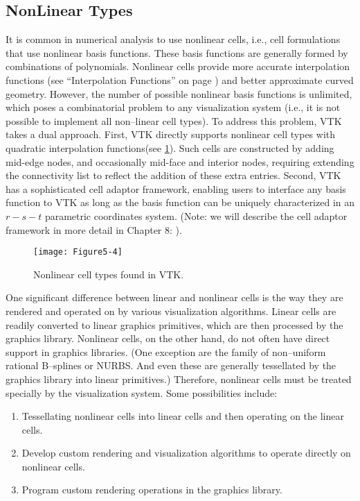 \subsection{NonLinear Types}

It is common in numerical analysis to use nonlinear cells, i.e., cell formulations that use nonlinear basis functions. These basis functions are generally formed by combinations of polynomials. Nonlinear cells provide more accurate interpolation functions (see ``Interpolation Functions'' on page \pageref{sec:interpolation_functions}) and better approximate curved geometry. However, the number of possible nonlinear basis functions is unlimited, which poses a combinatorial problem to any visualization system (i.e., it is not possible to implement all non--linear cell types). To address this problem, VTK takes a dual approach. First, VTK directly supports nonlinear cell types with quadratic interpolation functions(see \ref{fig:Figure5-4}). Such cells are constructed by adding mid-edge nodes, and occasionally mid-face and interior nodes, requiring extending the connectivity list to reflect the addition of these extra entries. Second, VTK has a sophisticated cell adaptor framework, enabling users to interface any basis function to VTK as long as the basis function can be uniquely characterized in an $r-s-t$ parametric coordinates system. (Note: we will describe the cell adaptor framework in more detail in Chapter 8: ).


\begin{figure}[!htb]
	\centering
	\texttt{[image: Figure5-4]}
	\caption{Nonlinear cell types found in VTK.}
	\label{fig:Figure5-4}
\end{figure}

One significant difference between linear and nonlinear cells is the way they are rendered and operated on by various visualization algorithms. Linear cells are readily converted to linear graphics primitives, which are then processed by the graphics library. Nonlinear cells, on the other hand, do not often have direct support in graphics libraries. (One exception are the family of non--uniform rational B--splines or NURBS. And even these are generally tessellated by the graphics library into linear primitives.) Therefore, nonlinear cells must be treated specially by the visualization system. Some possibilities include:

\begin{enumerate}

\item Tessellating nonlinear cells into linear cells and then operating on the linear cells.

\item Develop custom rendering and visualization algorithms to operate directly on nonlinear cells.

\item Program custom rendering operations in the graphics library.

\end{enumerate}

